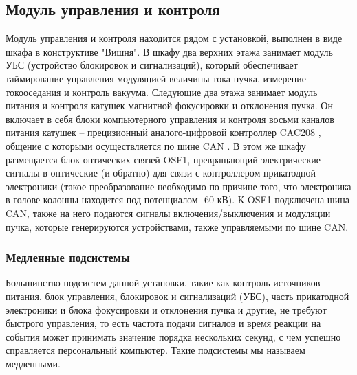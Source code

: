 \documentclass[14pt,russian,a4paper]{extarticle}
\begin{document}
\subsection{Модуль управления и контроля}
Модуль управления и контроля находится рядом с установкой, выполнен в виде шкафа в конструктиве "Вишня". В шкафу два верхних этажа занимает модуль УБС (устройство блокировок и сигнализаций), который обеспечивает таймирование управления модуляцией величины тока пучка, измерение токооседания и контроль вакуума. Следующие два этажа занимает модуль питания и контроля катушек магнитной фокусировки и отклонения пучка. Он включает в себя блоки компьютерного управления и контроля восьми каналов питания катушек – прецизионный аналого-цифровой контроллер CAC208 \cite{kozak_cac208}, общение с которыми осуществляется по шине CAN \cite{can}. В этом же шкафу размещается блок оптических связей OSF1, превращающий электрические сигналы в оптические (и обратно) для связи с контроллером прикатодной электроники (такое преобразование необходимо по причине того, что электроника в голове колонны находится под потенциалом -60 кВ). К OSF1 подключена шина CAN, также на него подаются сигналы включения/выключения и модуляции пучка, которые генерируются устройствами, также управляемыми по шине CAN.
\subsubsection{Медленные подсистемы}
Большинство подсистем данной установки, такие как контроль источников питания, блок управления, блокировок и сигнализаций (УБС), часть прикатодной электроники и блока фокусировки и отклонения пучка и другие, не требуют быстрого управления, то есть частота подачи сигналов и время реакции на события может принимать значение порядка нескольких секунд, с чем успешно справляется персональный компьютер. Такие подсистемы мы называем медленными.
\end{document}
